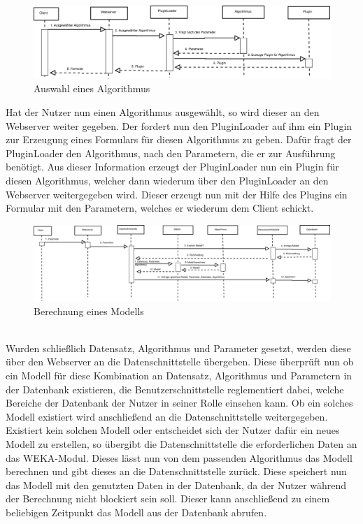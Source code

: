 \begin{figure}[h]
	\hspace{-0.25\linewidth}\includegraphics[width=1.5\linewidth]{Grafik/Diagramm/Szenarios/Berechnung2}
	\caption[]{Auswahl eines Algorithmus}
\end{figure}
\noindent Hat der Nutzer nun einen Algorithmus ausgewählt, so wird dieser an den Webserver weiter gegeben. Der fordert nun den PluginLoader auf ihm ein Plugin zur Erzeugung eines Formulars für diesen Algorithmus zu geben. Dafür fragt der PluginLoader den Algorithmus, nach den Parametern, die er zur Ausführung benötigt. Aus dieser Information erzeugt der PluginLoader nun ein Plugin für diesen Algorithmus, welcher dann wiederum über den PluginLoader an den Webserver weitergegeben wird. Dieser erzeugt nun mit der Hilfe des Plugins ein Formular mit den Parametern, welches er wiederum dem Client schickt.
\pagebreak
\begin{figure}
	\vspace{-80pt}
	\begin{center}
		\includegraphics[width =1\textheight, angle=90 ]{Grafik/Diagramm/Szenarios/Berechnung3}
	\end{center}
	\vspace{-15pt}
	\caption[]{Berechnung eines Modells}
	\label{fig:Berechnung3}
	\vspace{-70pt}
\end{figure}\\
Wurden schließlich Datensatz, Algorithmus und Parameter gesetzt, werden diese über den Webserver an die Datenschnittstelle übergeben. Diese überprüft nun ob ein Modell für diese Kombination an Datensatz, Algorithmus und Parametern in der Datenbank existieren, die Benutzerschnittstelle reglementiert dabei, welche Bereiche der Datenbank der Nutzer in seiner Rolle einsehen kann. Ob ein solches Modell existiert wird anschließend an die Datenschnittstelle weitergegeben. Existiert kein solchen Modell oder entscheidet sich der Nutzer dafür ein neues Modell zu erstellen, so übergibt die Datenschnittstelle die erforderlichen Daten an das WEKA-Modul. Dieses lässt nun von dem passenden Algorithmus das Modell berechnen und gibt dieses an die Datenschnittstelle zurück. Diese speichert nun das Modell mit den genutzten Daten in der Datenbank, da der Nutzer während der Berechnung nicht blockiert sein soll. Dieser kann anschließend zu einem beliebigen Zeitpunkt das Modell aus der Datenbank abrufen.